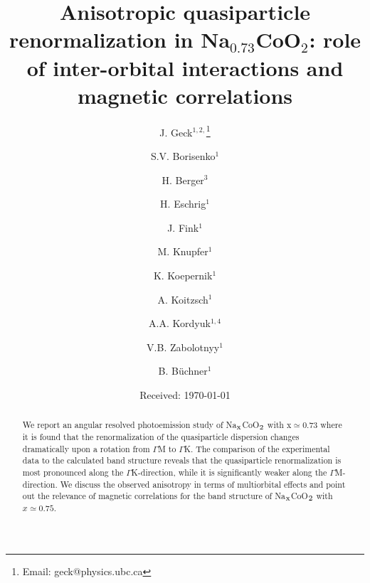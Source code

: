 \documentclass[preprint,showpacs,preprintnumbers,amsmath,amssymb,twoside,aps]{revtex4}
\begin{document}
\newcommand{\NCOx}{Na$_{\mbox{\scriptsize x}}$CoO$_{\mbox{\scriptsize 2}}$}
\newcommand{\NCO}{Na$_{\mbox{\scriptsize 0.73}}$CoO$_{\mbox{\scriptsize 2}}$}
%
\newcommand{\NCOc}{Na$_{\mbox{\scriptsize 0.75}}$CoO$_{\mbox{\scriptsize 2}}$}
\newcommand{\tco}{T$_{\mbox{\scriptsize CO}}$}
\newcommand{\tso}{T$_{\mbox{\scriptsize SO}}$}
\newcommand{\tc}{T$_{\mbox{\scriptsize C}}$}
\newcommand{\tilt}{I$_{\mbox{\scriptsize 300}}$}
\newcommand{\GM}{$\Gamma$M}
\newcommand{\GK}{$\Gamma$K}
\newcommand{\LPSMO}{(La$_{\mbox{\scriptsize 1-y}}$Pr$_{\mbox{\scriptsize y}}$)$_{\mbox{\scriptsize 7/8}}$Sr$_{\mbox{\scriptsize 1/8}}$MnO$_{\mbox{\scriptsize 3}}$}
%
\newcommand{\quadru}{ $(1\pm 0.25,\pm 0.25,0)$}
\newcommand{\doub}{ $(1\pm 0.5,\pm 0.5,0)$}

%




\title{Anisotropic quasiparticle renormalization in Na$_{0.73}$CoO$_2$:
 role of inter-orbital interactions and magnetic correlations}

\author{J. Geck$^{1,2,}$\footnote{Email: geck@physics.ubc.ca}}
\author{S.V. Borisenko$^1$}
\author{H. Berger$^3$}
\author{H. Eschrig$^1$}
\author{J. Fink$^1$}
\author{M. Knupfer$^1$}
\author{K. Koepernik$^1$}
\author{A. Koitzsch$^1$}
\author{A.A. Kordyuk$^{1,4}$}
\author{V.B. Zabolotnyy$^1$}
\author{B. B\"uchner$^1$}

%
%








%
%
\date{Received: \today}
%
\begin{abstract}
We report an angular resolved photoemission study of \NCOx \/ with x$\simeq$0.73 where it is found that the renormalization of the quasiparticle
dispersion changes dramatically upon a rotation from \GM \/ to \GK. The comparison of the experimental data to the calculated band structure reveals
that the  quasiparticle renormalization is most pronounced along the \GK-direction, while it is significantly weaker along the \GM-direction. We
discuss the observed anisotropy in terms of multiorbital effects and point out the relevance of magnetic correlations for the band structure of \NCOx
\/ with $x\simeq0.75$.
\end{abstract}
\end{document}
